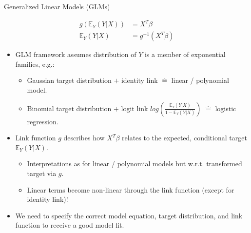 \documentclass[11pt,compress,t,notes=noshow, aspectratio=169, xcolor=table]{beamer}
\begin{document}
\begin{frame}{Generalized Linear Models (GLMs)}

\begin{align*}
g\left(\mathbb{E}_Y(Y \vert X)\right) &= X^T\beta \\
\mathbb{E}_Y \left(Y \vert X\right) &= g^{-1}(X^T\beta)
\end{align*}
\begin{itemize}[<+->]
\item GLM framework assumes distribution of $Y$ is a member of exponential families, e.g.: %
\begin{itemize}[<.->]
    \item Gaussian target distribution $+$ identity link $\hat =$ linear / polynomial model.
    \item Binomial target distribution $+$ logit link $log\left(\frac{\mathbb{E}_Y(Y \vert X)}{1 - \mathbb{E}_Y(Y \vert X)}\right)$ $\hat =$ logistic regression.
\end{itemize}
\item Link function $g$ describes how $X^T\beta$ relates to the expected, conditional target $\mathbb{E}_Y(Y \vert X)$.
\begin{itemize}[<.->]
    \item Interpretations as for linear / polynomial models but w.r.t. transformed target via $g$.
    \item Linear terms become non-linear through the link function (except for identity link)!
\end{itemize}
\item We need to specify the correct model equation, target distribution, and link function to receive a good model fit.
\end{itemize}
\end{frame}
\end{document}
